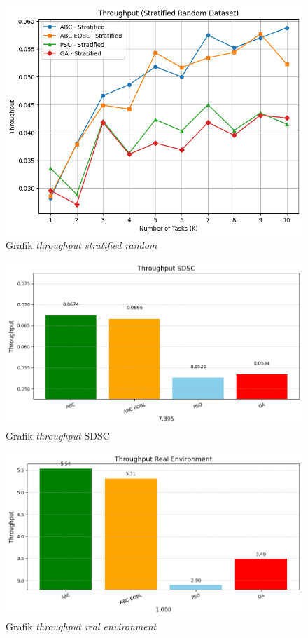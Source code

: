 \begin{figure} [H]
    \centering
    \includegraphics[width=0.75\linewidth]{gambar/Grafik Throughput Stratified Random.png}
    \caption{Grafik \textit{throughput stratified random}}
\end{figure}

\begin{figure} [H]
    \centering
    \includegraphics[width=0.75\linewidth]{gambar/Grafik Throughput SDSC.png}
    \caption{Grafik \textit{throughput} SDSC}
\end{figure}

\newpage

\begin{figure} [H]
    \centering
    \includegraphics[width=0.75\linewidth]{gambar/Grafik Throughput Real Environment.png}
    \caption{Grafik \textit{throughput real environment}}
\end{figure}

